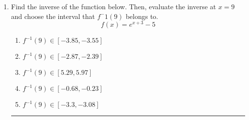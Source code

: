 \documentclass[14pt]{extbook}
\newcommand{\litem}[1]{\item#1\hspace*{-1cm}\rule{\textwidth}{0.4pt}}
\begin{document}
\begin{enumerate}
{\begin{enumerate}[label=\Alph*.]
\end{enumerate} }
\litem{
Find the inverse of the function below. Then, evaluate the inverse at $x = 9$ and choose the interval that $f^-1(9)$ belongs to.\[ f(x) = e^{x+3}-5 \]\begin{enumerate}[label=\Alph*.]
\item \( f^{-1}(9) \in [-3.85, -3.55] \)
\item \( f^{-1}(9) \in [-2.87, -2.39] \)
\item \( f^{-1}(9) \in [5.29, 5.97] \)
\item \( f^{-1}(9) \in [-0.68, -0.23] \)
\item \( f^{-1}(9) \in [-3.3, -3.08] \)

\end{enumerate} }
\end{enumerate}
\end{document}
